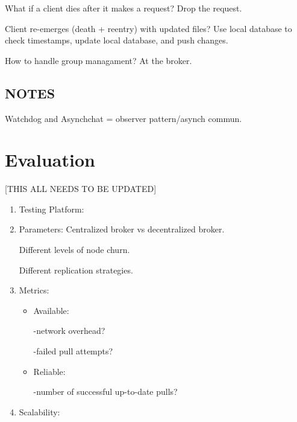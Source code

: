 What if a client dies after it makes a request? Drop the request.

Client re-emerges (death + reentry) with updated files? Use local database to check timestamps, update local database, and push changes.

How to handle group managament? At the broker.

\subsection{NOTES}
Watchdog and Asynchchat = observer pattern/asynch commun.

\section{Evaluation}
[THIS ALL NEEDS TO BE UPDATED]
\begin{enumerate}
\item Testing Platform:
\item Parameters:
Centralized broker vs decentralized broker.

Different levels of node churn.

Different replication strategies.
\item Metrics:
\begin{itemize}
\item Available:

-network overhead?

-failed pull attempts?
\item Reliable:

-number of successful up-to-date pulls?
\end{itemize}
\item Scalability:
\end{enumerate}
